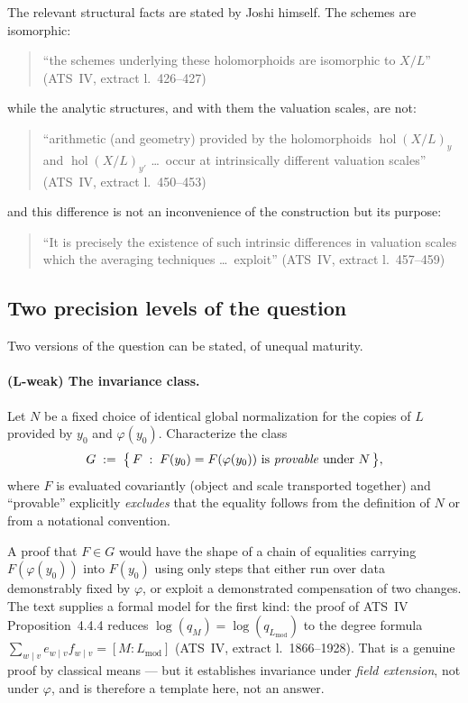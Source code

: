 \documentclass[11pt,a4paper]{article}
\theoremstyle{definition}
\theoremstyle{plain}
\theoremstyle{definition}
\newcommand{\hol}{\operatorname{hol}}
\newcommand{\anchor}[2]{(#1, extract l.~#2)}
\begin{document}
The relevant structural facts are stated by Joshi himself. The schemes are
isomorphic:

\begin{quote}\small
``the schemes underlying these holomorphoids are isomorphic to $X/L$''
\hfill\anchor{ATS~IV}{426--427}
\end{quote}

while the analytic structures, and with them the valuation scales, are not:

\begin{quote}\small
``arithmetic (and geometry) provided by the holomorphoids $\hol(X/L)_y$ and
$\hol(X/L)_{y'}$ \ldots\ occur at intrinsically different valuation scales''
\hfill\anchor{ATS~IV}{450--453}
\end{quote}

and this difference is not an inconvenience of the construction but its purpose:

\begin{quote}\small
``It is precisely the existence of such intrinsic differences in valuation scales
which the averaging techniques \ldots\ exploit''
\hfill\anchor{ATS~IV}{457--459}
\end{quote}

\subsection{Two precision levels of the question}

Two versions of the question can be stated, of unequal maturity.

\paragraph{(L-weak) The invariance class.}
Let $N$ be a fixed choice of identical global normalization for the copies of $L$
provided by $y_0$ and $\varphi(y_0)$. Characterize the class
\[
  G \;:=\; \bigl\{\, F \;:\; F(y_0) = F(\varphi(y_0)) \text{ is \emph{provable}
  under } N \,\bigr\},
\]
where $F$ is evaluated covariantly (object and scale transported together) and
``provable'' explicitly \emph{excludes} that the equality follows from the
definition of $N$ or from a notational convention.

A proof that $F \in G$ would have the shape of a chain of equalities carrying
$F(\varphi(y_0))$ into $F(y_0)$ using only steps that either run over data
demonstrably fixed by $\varphi$, or exploit a demonstrated compensation of two
changes. The text supplies a formal model for the first kind: the proof of ATS~IV
Proposition~4.4.4 reduces $\log(q_M) = \log(q_{L_{\mathrm{mod}}})$ to the degree
formula $\sum_{w\mid v} e_{w\mid v} f_{w\mid v} = [M : L_{\mathrm{mod}}]$
\anchor{ATS~IV}{1866--1928}. That is a genuine proof by classical means --- but it
establishes invariance under \emph{field extension}, not under $\varphi$, and is
therefore a template here, not an answer.
\end{document}
